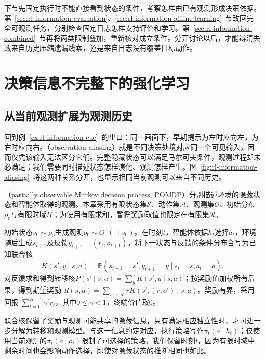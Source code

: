 下节先固定执行时不能直接看到状态的条件，考察怎样由已有观测形成决策依据。第~\ref{sec:rl-information-evaluation}、\ref{sec:rl-information-offline-learning}~节改回完全可观测任务，分别检查固定日志怎样支持评价和学习。第~\ref{sec:rl-information-combined}~节再将两类限制叠加，重新核对成立条件。分开讨论以后，才能辨清失败来自历史压缩遗漏线索，还是来自日志没有覆盖目标动作。

\section{决策信息不完整下的强化学习}
\label{sec:rl-information-partial-observation}

\subsection{从当前观测扩展为观测历史}
\label{sec:rl-information-history-policy}

回到例~\ref{ex:rl-information-cue}~的出口：同一画面下，早期提示为左时应向左，为右时应向右。（observation aliasing）就是不同决策处境对应同一个可见输入，因而仅凭该输入无法区分它们。完整隐藏状态可以满足马尔可夫条件，观测过程却未必满足；我们需要同时描述状态怎样演化、观测怎样产生。图~\ref{fig:rl-information-aliasing}~将这两种关系分开，也显示相同当前观测可以来自不同历史。

\begin{definition}[有限部分可观测马尔可夫决策过程]
  \label{def:rl-information-pomdp}
  （partially observable Markov decision process, POMDP）分别描述环境的隐藏状态和智能体取得的观测。本章采用有限状态集$\mathcal S$、动作集$\mathcal A$、观测集$\mathcal O$、初始分布$\rho_0$与有限时域$H$；为使用有限求和，暂将奖励取值也限定在有限集$\mathcal R$。

  初始状态$s_0\sim\rho_0$生成观测$o_0\sim O_0(\cdot\mid s_0)$。在时刻$t$，智能体依据$h_t$选择$a_t$，环境随后生成$s_{t+1}$及反馈$y_{t+1}=(r_t,o_{t+1})$。将下一状态与反馈的条件分布合写为已知联合核
  \[
    K(s',y\mid s,a)
    =\mathbb P(s_{t+1}=s',y_{t+1}=y\mid s_t=s,a_t=a).
  \]
  对反馈求和得到转移核$P(s'\mid s,a)=\sum_yK(s',y\mid s,a)$；按奖励值加权所有后果，得到期望奖励
  $R(s,a)=\sum_{s',r,o'}rK(s',(r,o')\mid s,a)$。奖励有界，采用回报
  $\sum_{t=0}^{H-1}\gamma^t r_t$，其中$0\leq\gamma<1$，终端价值取0。
\end{definition}

联合核保留了奖励与观测可能共享的隐藏信息，只有满足相应独立性时，才可进一步分解为转移和观测模型。与这一信息约定对应，执行策略写作$\pi_t(a\mid h_t)$；仅使用当前观测的$\pi_t(a\mid o_t)$限制了可选择的策略。我们保留时刻$t$，因为有限时域中剩余时间也会影响动作选择，即使对隐藏状态的推断相同也如此。


